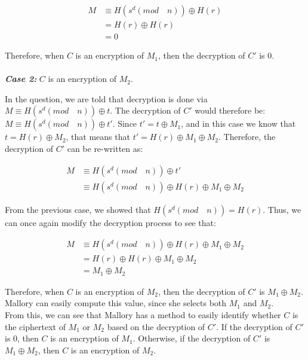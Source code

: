 \documentclass[11pt]{article}
\theoremstyle{definition}
\begin{document}
\begin{enumerate}
    \begin{align*}
        M &\equiv H(s^d (mod \quad n)) \oplus H(r) \\
        &= H(r) \oplus H(r) \\
        &= 0
    \end{align*}
    
    Therefore, when $C$ is an encryption of $M_1$, then the decryption of $C'$ is 0. \\ \\
    
    
    \textbf{\textit{Case 2:}} $C$ is an encryption of $M_2$.
    
    In the question, we are told that decryption is done via $M \equiv H(s^d (mod \quad n)) \oplus t$. The decryption of $C'$ would therefore be: $M \equiv H(s^d (mod \quad n)) \oplus t'$. Since $t' = t \oplus M_1$, and in this case we know that $t = H(r) \oplus M_2$, that means that $t' = H(r) \oplus M_1 \oplus M_2$. Therefore, the decryption of $C'$ can be re-written as: 
    
    \begin{align*}
        M &\equiv H(s^d (mod \quad n)) \oplus t' \\
        &\equiv H(s^d (mod \quad n)) \oplus H(r) \oplus M_1 \oplus M_2
    \end{align*}
    
    From the previous case, we showed that $H(s^d (mod \quad n)) = H(r)$. Thus, we can once again modify the decryption process to see that:
    
    \begin{align*}
        M &\equiv H(s^d (mod \quad n)) \oplus H(r) \oplus M_1 \oplus M_2 \\
        &= H(r) \oplus H(r) \oplus M_1 \oplus M_2 \\
        &= M_1 \oplus M_2
    \end{align*}
    
    Therefore, when $C$ is an encryption of $M_2$, then the decryption of $C'$ is $M_1 \oplus M_2$. Mallory can easily compute this value, since she selects both $M_1$ and $M_2$. \\
    
    From this, we can see that Mallory has a method to easily identify whether $C$ is the ciphertext of $M_1$ or $M_2$ based on the decryption of $C'$. If the decryption of $C'$ is 0, then $C$ is an encryption of $M_1$. Otherwise, if the decryption of $C'$ is $M_1 \oplus M_2$, then $C$ is an encryption of $M_2$.
    


\end{enumerate}
\end{document}
